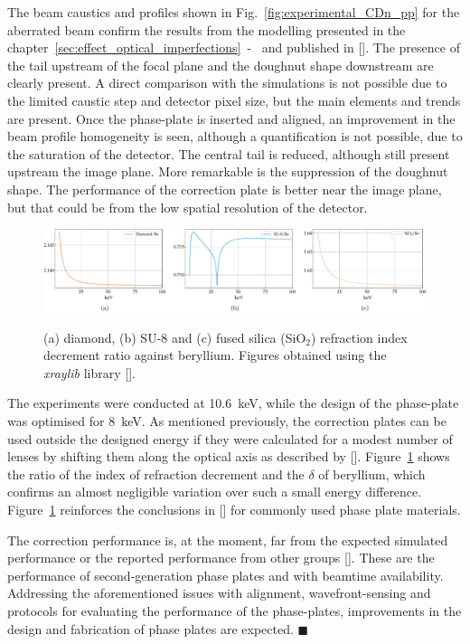 \begin{refsection}
The beam caustics and profiles shown in Fig.~\ref{fig:experimental_CDn_pp} for the aberrated beam confirm the results from the modelling presented in the chapter~\ref{sec:effect_optical_imperfections}~-~\textit{} and published in [\cite{Celestre2020}]. The presence of the tail upstream of the focal plane and the doughnut shape downstream are clearly present. A direct comparison with the simulations is not possible due to the limited caustic step and detector pixel size, but the main elements and trends are present. Once the phase-plate is inserted and aligned, an improvement in the beam profile homogeneity is seen, although a quantification is not possible, due to the saturation of the detector. The central tail is reduced, although still present upstream the image plane. More remarkable is the suppression of the doughnut shape. The performance of the correction plate is better near the image plane, but that could be from the low spatial resolution of the detector. 

\begin{figure}[t]
    \centering
    {\includegraphics[width=1\linewidth]{figures/ch03/n_plate.pdf}}
    \caption[Index of refraction ratio for common phase plate materials]{(a) diamond, (b) SU-8 and (c) fused silica (SiO$_2$) refraction index decrement ratio against beryllium. Figures obtained using the \textit{xraylib} library [\cite{Brunetti2004, Schoonjans2011}].}
    \label{fig:delta_correction_plate}
\end{figure}

The experiments were conducted at 10.6~keV, while the design of the phase-plate was optimised for 8~keV. As mentioned previously, the correction plates can be used outside the designed energy if they were calculated for a modest number of lenses by shifting them along the optical axis as described by [\cite[\textit{\S6}]{Seiboth2018}]. Figure~\ref{fig:delta_correction_plate} shows the ratio of the index of refraction decrement and the $\delta$ of beryllium, which confirms an almost negligible variation over such a small energy difference. Figure~\ref{fig:delta_correction_plate} reinforces the conclusions in [\cite[\textit{\S6}]{Seiboth2018}] for commonly used phase plate materials.

The correction performance is, at the moment, far from the expected simulated performance or the reported performance from other groups [\cite{Seiboth2017,Seiboth2018,Seiboth2020,Dhamgaye2020}]. These are the performance of second-generation phase plates and with beamtime availability. Addressing the aforementioned issues with alignment, wavefront-sensing and protocols for evaluating the performance of the phase-plates, improvements in the design and fabrication of phase plates are expected.  $\blacksquare$

\printbibliography[heading=subbibliography]
\end{refsection}

